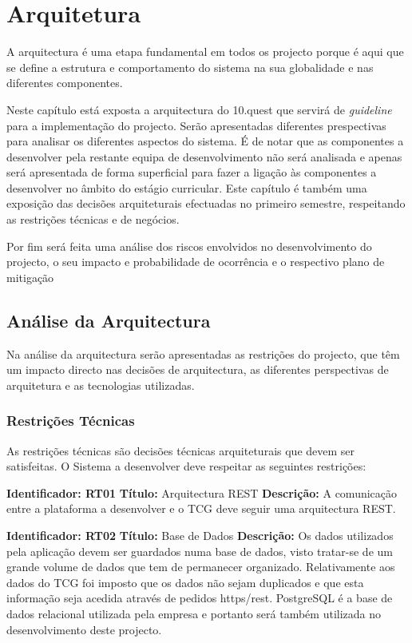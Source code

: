 
\chapter{Arquitetura}
\label{sec:arquitetura}

A arquitectura é uma etapa fundamental em todos os projecto porque é aqui que se define a estrutura e comportamento do sistema na sua globalidade e nas diferentes componentes.

Neste capítulo está exposta a arquitectura do 10.quest que servirá de \textit{guideline} para a implementação do projecto. Serão apresentadas diferentes prespectivas para analisar os diferentes aspectos do sistema. É de notar que as componentes a desenvolver pela restante equipa de desenvolvimento não será analisada e apenas será apresentada de forma superficial para fazer a ligação às componentes a desenvolver no âmbito do estágio curricular.
Este capítulo é também uma exposição das decisões arquiteturais efectuadas no primeiro semestre, respeitando as restrições técnicas e de negócios.

Por fim será feita uma análise dos riscos envolvidos no desenvolvimento do projecto, o seu impacto e probabilidade de ocorrência e o respectivo plano de mitigação




\section{Análise da Arquitectura}
\label{analisearq}

Na análise da arquitectura serão apresentadas as restrições do projecto, que têm um impacto directo nas decisões de arquitectura, as diferentes perspectivas de arquitetura e as tecnologias utilizadas.

\subsection{Restrições Técnicas}
As restrições técnicas são decisões técnicas arquiteturais que devem ser satisfeitas. O Sistema a desenvolver deve respeitar as seguintes restrições:

\textbf{Identificador: RT01}
\newline
\textbf{Título:} Arquitectura REST
\newline
\textbf{Descrição:} A comunicação entre a plataforma a desenvolver e o TCG deve seguir uma arquitectura REST.

\textbf{Identificador: RT02}
\newline
\textbf{Título:} Base de Dados
\newline
\textbf{Descrição:} Os dados utilizados pela aplicação devem ser guardados numa base de dados, visto tratar-se de um grande volume de dados que tem de permanecer organizado. Relativamente aos dados do TCG foi imposto que os dados não sejam duplicados e que esta informação seja acedida através de pedidos \acrshort{https}/\acrshort{rest}. PostgreSQL\cite{sql} é a base de dados relacional utilizada pela empresa e portanto será também utilizada no desenvolvimento deste projecto.

